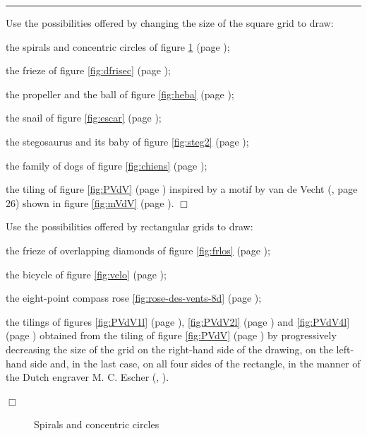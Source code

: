 \noindent \rule{137mm}{0.1mm}\par\nopagebreak %
\begin{exercices}{Use the possibilities offered by changing the size of the square grid
to draw:

\tiret the spirals and concentric circles of figure \ref{fig:spirales} (page \pageref{fig:spirales});

\tiret the frieze of figure \ref{fig:dfrisec} (page \pageref{fig:dfrisec});

\tiret the propeller and the ball of figure \ref{fig:heba} (page \pageref{fig:heba});

\tiret the snail of figure \ref{fig:escar} (page \pageref{fig:escar});

\tiret the stegosaurus and its baby of figure \ref{fig:steg2} (page \pageref{fig:steg2});

\tiret the family of dogs of figure \ref{fig:chiens} (page \pageref{fig:chiens});

\tiret the tiling of figure \ref{fig:PVdV} (page \pageref{fig:PVdV}) inspired by a motif by
van de Vecht (\cite{escher1}, page 26) shown in figure \ref{fig:mVdV} (page \pageref{fig:mVdV}).
\noindent $\Box$}\end{exercices}
\begin{exercices}{Use the possibilities offered by rectangular grids
to draw:

\tiret the frieze of overlapping diamonds of figure \ref{fig:frlos} (page \pageref{fig:frlos});

\tiret the bicycle of figure \ref{fig:velo} (page \pageref{fig:velo});

\tiret the eight-point compass rose
\ref{fig:rose-des-vents-8d} (page \pageref{fig:rose-des-vents-8d});

\tiret the tilings of figures \ref{fig:PVdV1l} (page \pageref{fig:PVdV1l}),
\ref{fig:PVdV2l} (page \pageref{fig:PVdV2l}) and \ref{fig:PVdV4l} (page \pageref{fig:PVdV4l}) obtained
from the tiling of figure \ref{fig:PVdV} (page \pageref{fig:PVdV}) by pro\-gres\-sive\-ly decreasing the size of the grid on the right-hand side
of the drawing, on the left-hand side and, in the last case, on all four sides of the rectangle, in the manner of the Dutch
engraver M. C. Escher (\cite{escher1}, \cite{escher2}).

\noindent $\Box$}\end{exercices}
\begin{figure}[htbp]
 \caption{Spirals and concentric circles}
 \label{fig:spirales}
\end{figure}

